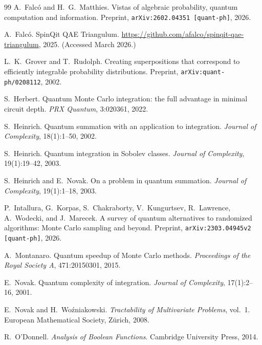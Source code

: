 \documentclass[12pt,a4paper]{article}
\theoremstyle{plain}
\theoremstyle{definition}
\theoremstyle{remark}
\begin{document}
\begin{thebibliography}{99}
A.~Falc\'{o} and H.~G.~Matthies.
\newblock Vistas of algebraic probability, quantum computation and information.
\newblock Preprint, \texttt{arXiv:2602.04351 [quant-ph]}, 2026.

A.~Falc\'{o}.
\newblock SpinQit QAE Triangulum.
\newblock \url{https://github.com/afalco/spinqit-qae-triangulum}, 2025.
\newblock (Accessed March 2026.)

L.~K.~Grover and T.~Rudolph.
\newblock Creating superpositions that correspond to efficiently integrable
  probability distributions.
\newblock Preprint, \texttt{arXiv:quant-ph/0208112}, 2002.

S.~Herbert.
\newblock Quantum {Monte Carlo} integration: the full advantage in minimal
  circuit depth.
\newblock \textit{PRX Quantum}, 3:020361, 2022.

S.~Heinrich.
\newblock Quantum summation with an application to integration.
\newblock \textit{Journal of Complexity}, 18(1):1--50, 2002.

S.~Heinrich.
\newblock Quantum integration in {Sobolev} classes.
\newblock \textit{Journal of Complexity}, 19(1):19--42, 2003.

S.~Heinrich and E.~Novak.
\newblock On a problem in quantum summation.
\newblock \textit{Journal of Complexity}, 19(1):1--18, 2003.

P.~Intallura, G.~Korpas, S.~Chakraborty, V.~Kungurtsev, R.~Lawrence,
  A.~Wodecki, and J.~Marecek.
\newblock A survey of quantum alternatives to randomized algorithms: {Monte
  Carlo} sampling and beyond.
\newblock Preprint, \texttt{arXiv:2303.04945v2 [quant-ph]}, 2026.

A.~Montanaro.
\newblock Quantum speedup of Monte Carlo methods.
\newblock \textit{Proceedings of the Royal Society A}, 471:20150301, 2015.

E.~Novak.
\newblock Quantum complexity of integration.
\newblock \textit{Journal of Complexity}, 17(1):2--16, 2001.

E.~Novak and H.~Wo\'{z}niakowski.
\newblock \textit{Tractability of Multivariate Problems}, vol.~1.
\newblock European Mathematical Society, Z\"urich, 2008.

R.~O'Donnell.
\newblock \textit{Analysis of Boolean Functions}.
\newblock Cambridge University Press, 2014.


\end{thebibliography}
\end{document}
